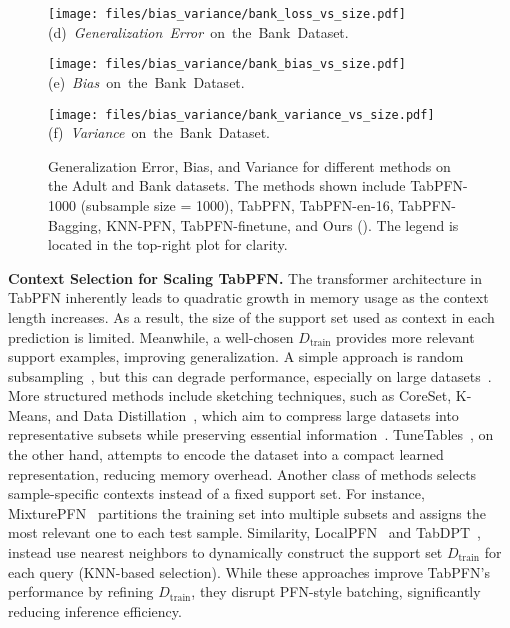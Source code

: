 \begin{figure*}[h]
\begin{minipage}{0.32\textwidth}
    \centering
    \texttt{[image: files/bias\_variance/bank\_loss\_vs\_size.pdf]}
    {\scriptsize \mbox{(d) {\textit{Generalization Error} on the Bank Dataset.}}}
    \label{fig:bank_generalization_error}
\end{minipage}%
\begin{minipage}{0.32\textwidth}
    \centering
    \texttt{[image: files/bias\_variance/bank\_bias\_vs\_size.pdf]}
    {\scriptsize \mbox{(e) {\textit{Bias} on the Bank Dataset.}}}
    \label{fig:bank_bias}
\end{minipage}%
\begin{minipage}{0.32\textwidth}
    \centering
    \texttt{[image: files/bias\_variance/bank\_variance\_vs\_size.pdf]}
    {\scriptsize \mbox{(f) {\textit{Variance} on the Bank Dataset.}}}
    \label{fig:bank_variance}
\end{minipage}
\caption{Generalization Error, Bias, and Variance for different methods on the Adult and Bank datasets. The methods shown include TabPFN-1000 (subsample size = 1000), TabPFN, TabPFN-en-16, TabPFN-Bagging, KNN-PFN, TabPFN-finetune, and Ours (\name). The legend is located in the top-right plot for clarity.}
\label{fig:generalization_bias_variance_plots}
\vspace{-5mm}
\end{figure*}
\textbf{Context Selection for Scaling TabPFN.}  The transformer architecture in TabPFN inherently leads to quadratic growth in memory usage as the context length increases.
As a result, the size of the support set used as context in each prediction is limited. Meanwhile, a well-chosen \(D_{\text{train}}\)
provides more relevant support examples, improving generalization. A simple approach is random subsampling~\cite{McElfreshKVCRGW23when}, but this can degrade performance, especially on large datasets~\cite{ICDPFN}. More structured methods include sketching techniques, such as CoreSet, K-Means, and Data Distillation~\cite{ICDPFN}, which aim to compress large datasets into representative subsets while preserving essential information~\cite{Scaling_TabPFN}. 
TuneTables~\cite{TuneTables}, on the other hand, attempts to encode the dataset into a compact learned representation, reducing memory overhead. Another class of methods selects sample-specific contexts instead of a fixed support set. For instance, MixturePFN~\cite{MixturePFN} partitions the training set into multiple subsets and assigns the most relevant one to each test sample. Similarity, LocalPFN~\cite{LocalPFN} and TabDPT~\cite{MaTabDPT}, instead use nearest neighbors to dynamically construct the support set \(D_{\text{train}}\) for each query (KNN-based selection). While these approaches improve TabPFN’s performance by refining \(D_{\text{train}}\), they disrupt PFN-style batching, significantly reducing inference efficiency.%



